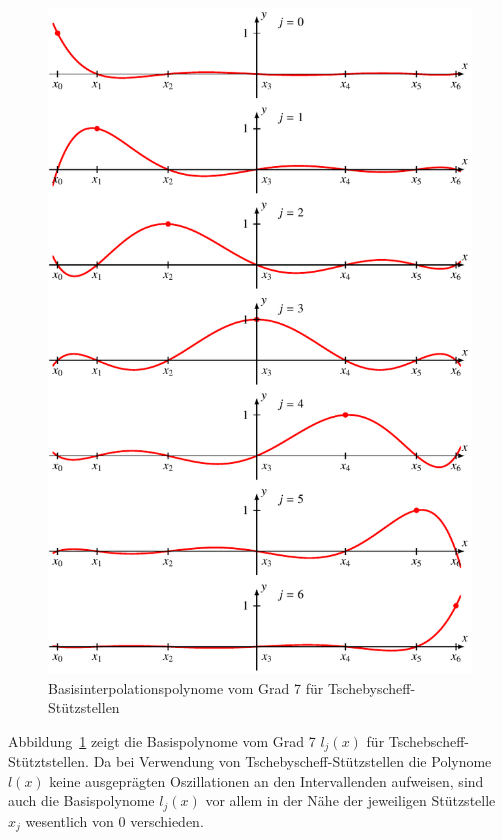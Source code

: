 \begin{figure}
\centering
\includegraphics{chapters/30-interpolation/figures/tschebasis.pdf}
\caption{Basisinterpolationspolynome vom Grad 7 für
Tschebyscheff-Stützstellen
\label{buch:figure:tschebyscheffbasis}}
\end{figure}
Abbildung~\ref{buch:figure:tschebyscheffbasis} zeigt die Basispolynome
vom Grad 7 $l_j(x)$ für Tschebscheff-Stütztstellen.
Da bei Verwendung von Tschebyscheff-Stützstellen die Polynome $l(x)$
keine ausgeprägten Oszillationen an den Intervallenden aufweisen, 
sind auch die Basispolynome $l_j(x)$ vor allem in der Nähe der
jeweiligen Stützstelle $x_j$ wesentlich von $0$ verschieden.









